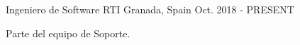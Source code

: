

\begin{cventries}

  \cventry
    {Ingeniero de Software} %
    {RTI} %
    {Granada, Spain} %
    {Oct. 2018 - PRESENT} %
    {
      \begin{cvitems} %
        \item {Parte del equipo de Soporte.}  
      \end{cvitems}
    }

\end{cventries}
